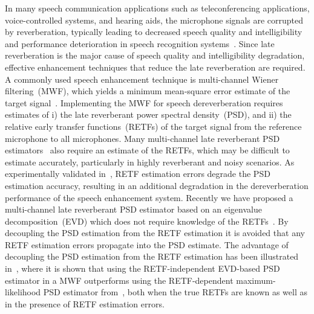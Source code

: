 \documentclass{article}
\begin{document}
In many speech communication applications such as teleconferencing applications, voice-controlled systems, and hearing aids, the microphone signals are corrupted by reverberation, typically leading to decreased speech quality and intelligibility~\cite{Beutelmann_2006,Warzybok_IWAENC_2014} and performance deterioration in speech recognition systems~\cite{Yoshioka_ISPM_2012}. 
Since late reverberation is the major cause of speech quality and intelligibility degradation, effective enhancement techniques that reduce the late reverberation are required.
A commonly used speech enhancement technique is multi-channel Wiener filtering~(MWF), which yields a minimum mean-square error estimate of the target signal~\cite{Doclo_SC_2007,Braun_EUSIPCO_2013,Kuklasinski_EUSIPCO_2014g}.
Implementing the MWF for speech dereverberation requires estimates of i) the late reverberant power spectral density~(PSD), and ii) the relative early transfer functions~(RETFs) of the target signal from the reference microphone to all microphones.
Many multi-channel late reverberant PSD estimators~\cite{Kuklasinski_EUSIPCO_2014g,Braun_EUSIPCO_2013,Braun_EURASIP_2015,Kuklasinski_ITASLP_2016,Schwartz_WASPAA_2015,Schwartz_ICASSP_2016} also require an estimate of the RETFs, which may be difficult to estimate accurately, particularly in highly reverberant and noisy scenarios.
As experimentally validated in~\cite{ASchwarz_ITASLP_2015, kuklasinski_AES_2016}, RETF estimation errors degrade the PSD estimation accuracy, resulting in an additional degradation in the dereverberation performance of the speech enhancement system.
Recently we have proposed a multi-channel late reverberant PSD estimator based on an eigenvalue decomposition~(EVD) which does not require knowledge of the RETFs~\cite{Kodrasi_ICASSP_2017}. 
By decoupling the PSD estimation from the RETF estimation it is avoided that any RETF estimation errors propagate into the PSD estimate.
The advantage of decoupling the PSD estimation from the RETF estimation has been illustrated in~\cite{Kodrasi_ICASSP_2017}, where it is shown that using the RETF-independent EVD-based PSD estimator in a MWF outperforms using the RETF-dependent maximum-likelihood PSD estimator from~\cite{Kuklasinski_EUSIPCO_2014g}, both when the true RETFs are known as well as in the presence of RETF estimation errors. 
\end{document}
